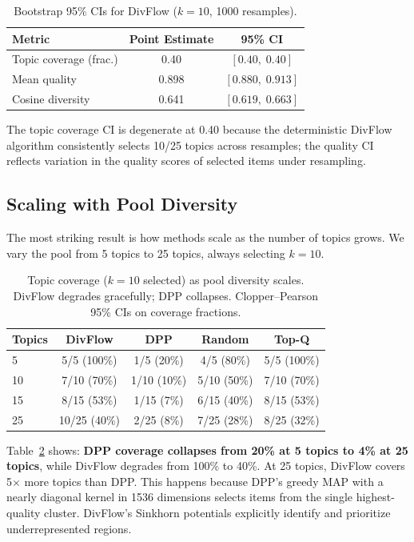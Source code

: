 \documentclass[10pt]{article}
\begin{document}
\begin{table}[t]
\centering
\caption{Bootstrap 95\% CIs for DivFlow ($k{=}10$, 1000 resamples).}
\label{tab:bootstrap}
\begin{tabular}{lcc}
\toprule
\textbf{Metric} & \textbf{Point Estimate} & \textbf{95\% CI} \\
\midrule
Topic coverage (frac.)  & 0.40 & $[0.40,\; 0.40]$ \\
Mean quality            & 0.898 & $[0.880,\; 0.913]$ \\
Cosine diversity        & 0.641 & $[0.619,\; 0.663]$ \\
\bottomrule
\end{tabular}
\end{table}

The topic coverage CI is degenerate at 0.40 because the deterministic DivFlow algorithm consistently selects 10/25 topics across resamples; the quality CI reflects variation in the quality scores of selected items under resampling.

\subsection{Scaling with Pool Diversity}
\label{sec:scaling}

The most striking result is how methods scale as the number of topics grows.
We vary the pool from 5 topics to 25 topics, always selecting $k=10$.

\begin{table}[t]
\centering
\caption{Topic coverage ($k{=}10$ selected) as pool diversity scales.
DivFlow degrades gracefully; DPP collapses.
Clopper--Pearson 95\% CIs on coverage fractions.}
\label{tab:scaling}
\begin{tabular}{lcccc}
\toprule
\textbf{Topics} & \textbf{DivFlow} & \textbf{DPP} & \textbf{Random} & \textbf{Top-Q} \\
\midrule
5  & 5/5\; (100\%) & 1/5\; (20\%) & 4/5\; (80\%) & 5/5\; (100\%) \\
10 & 7/10\; (70\%) & 1/10\; (10\%) & 5/10\; (50\%) & 7/10\; (70\%) \\
15 & 8/15\; (53\%) & 1/15\; (7\%) & 6/15\; (40\%) & 8/15\; (53\%) \\
25 & 10/25\; (40\%) & 2/25\; (8\%) & 7/25\; (28\%) & 8/25\; (32\%) \\
\bottomrule
\end{tabular}
\end{table}

Table~\ref{tab:scaling} shows: \textbf{DPP coverage collapses from 20\% at 5 topics to 4\% at 25 topics}, while DivFlow degrades from 100\% to 40\%.
At 25 topics, DivFlow covers 5$\times$ more topics than DPP.
This happens because DPP's greedy MAP with a nearly diagonal kernel in 1536 dimensions selects items from the single highest-quality cluster.
DivFlow's Sinkhorn potentials explicitly identify and prioritize underrepresented regions.
\end{document}
